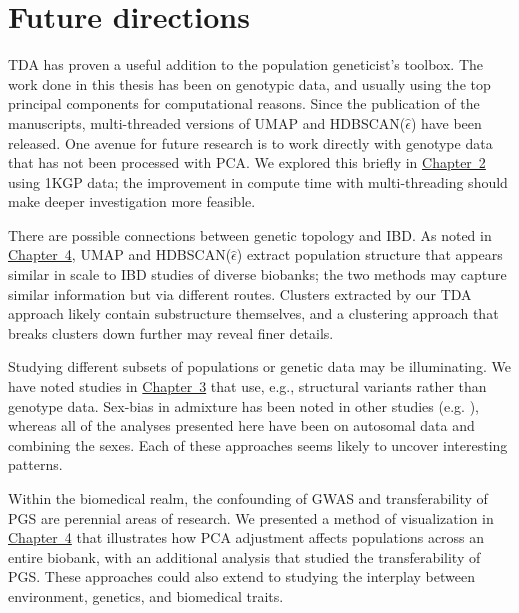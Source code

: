 \section{Future directions}

TDA has proven a useful addition to the population geneticist's toolbox. The work done in this thesis has been on genotypic data, and usually using the top principal components for computational reasons. Since the publication of the manuscripts, multi-threaded versions of UMAP and HDBSCAN($\hat{\epsilon}$) have been released. One avenue for future research is to work directly with genotype data that has not been processed with PCA. We explored this briefly in \hyperref[chap:chapter2]{Chapter~2} using 1KGP data; the improvement in compute time with multi-threading should make deeper investigation more feasible.

There are possible connections between genetic topology and IBD. As noted in \hyperref[chap:chapter4]{Chapter~4}, UMAP and HDBSCAN($\hat{\epsilon}$) extract population structure that appears similar in scale to IBD studies of diverse biobanks; the two methods may capture similar information but via different routes. Clusters extracted by our TDA approach likely contain substructure themselves, and a clustering approach that breaks clusters down further may reveal finer details.

Studying different subsets of populations or genetic data may be illuminating. We have noted studies in \hyperref[chap:chapter3]{Chapter~3} that use, e.g., structural variants rather than genotype data. Sex-bias in admixture has been noted in other studies (e.g. \citep{ongaro_evaluating_2021,korunes_sex-biased_2022,marcheco-teruel_cuba_2014}), whereas all of the analyses presented here have been on autosomal data and combining the sexes. Each of these approaches seems likely to uncover interesting patterns.

Within the biomedical realm, the confounding of GWAS and transferability of PGS are perennial areas of research. We presented a method of visualization in \hyperref[chap:chapter4]{Chapter~4} that illustrates how PCA adjustment affects populations across an entire biobank, with an additional analysis that studied the transferability of PGS. These approaches could also extend to studying the interplay between environment, genetics, and biomedical traits.

